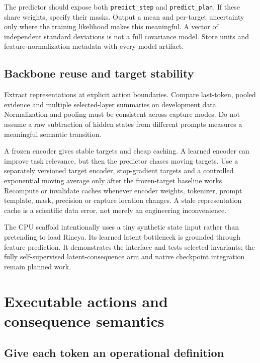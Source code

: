 \documentclass[
  11pt,
  a4paper,
]{article}
\begin{document}
The predictor should expose both \texttt{predict\_step} and
\texttt{predict\_plan}. If these share weights, specify their masks.
Output a mean and per-target uncertainty only where the training
likelihood makes this meaningful. A vector of independent standard
deviations is not a full covariance model. Store units and
feature-normalization metadata with every model artifact.

\subsection{Backbone reuse and target
stability}\label{backbone-reuse-and-target-stability}

Extract representations at explicit action boundaries. Compare
last-token, pooled evidence and multiple selected-layer summaries on
development data. Normalization and pooling must be consistent across
capture modes. Do not assume a raw subtraction of hidden states from
different prompts measures a meaningful semantic transition.

A frozen encoder gives stable targets and cheap caching. A learned
encoder can improve task relevance, but then the predictor chases moving
targets. Use a separately versioned target encoder, stop-gradient
targets and a controlled exponential moving average only after the
frozen-target baseline works. Recompute or invalidate caches whenever
encoder weights, tokenizer, prompt template, mask, precision or capture
location changes. A stale representation cache is a scientific data
error, not merely an engineering inconvenience.

The CPU scaffold intentionally uses a tiny synthetic state input rather
than pretending to load Rineya. Its learned latent bottleneck is
grounded through feature prediction. It demonstrates the interface and
tests selected invariants; the fully self-supervised latent-consequence
arm and native checkpoint integration remain planned work.

\section{Executable actions and consequence
semantics}\label{executable-actions-and-consequence-semantics}

\subsection{Give each token an operational
definition}\label{give-each-token-an-operational-definition}
\end{document}
